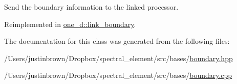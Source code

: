 Send the boundary information to the linked processor. 



 

Reimplemented in \hyperlink{classone__d_1_1link__boundary_af16859eb2f5ce2d623456644fc21e91f}{one\-\_\-d\-::link\-\_\-boundary}.



The documentation for this class was generated from the following files\-:\begin{DoxyCompactItemize}
\item 
/\-Users/justinbrown/\-Dropbox/spectral\-\_\-element/src/bases/\hyperlink{boundary_8hpp}{boundary.\-hpp}\item 
/\-Users/justinbrown/\-Dropbox/spectral\-\_\-element/src/bases/\hyperlink{boundary_8cpp}{boundary.\-cpp}\end{DoxyCompactItemize}
